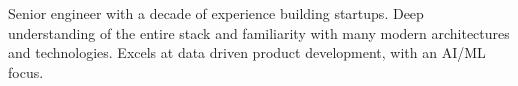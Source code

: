 

\begin{cvparagraph}

Senior engineer with a decade of experience building startups. Deep understanding of the entire stack and familiarity with many modern architectures and technologies. Excels at data driven product development, with an AI/ML focus.
\end{cvparagraph}
